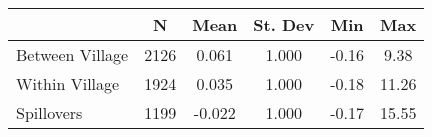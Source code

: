 \begin{tabular}{l*{5}{c}}\hline&\multicolumn{1}{c}{N}&\multicolumn{1}{c}{Mean}&\multicolumn{1}{c}{St. Dev}&\multicolumn{1}{c}{Min}&\multicolumn{1}{c}{Max}\\ \hline 
Between Village & 2126 & 0.061 & 1.000 & -0.16 & 9.38 \\
Within Village & 1924 & 0.035 & 1.000 & -0.18 & 11.26 \\
Spillovers & 1199 & -0.022 & 1.000 & -0.17 & 15.55 \\
\hline \end{tabular}
